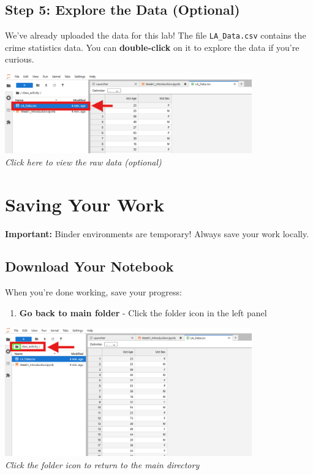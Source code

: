 \documentclass[11pt,a4paper]{article}
\begin{document}
\subsection{Step 5: Explore the Data (Optional)}

We've already uploaded the data for this lab! The file \texttt{LA\_Data.csv} contains the crime statistics data. You can \textbf{double-click} on it to explore the data if you're curious.

\begin{center}
\includegraphics[width=0.8\textwidth]{../Image_5.png}\\
\textit{Click here to view the raw data (optional)}
\end{center}

\section{Saving Your Work}

\begin{warningbox}
\textbf{Important:} Binder environments are temporary! Always save your work locally.
\end{warningbox}

\subsection{Download Your Notebook}

When you're done working, save your progress:

\begin{enumerate}
    \item \textbf{Go back to main folder} - Click the folder icon in the left panel
\end{enumerate}

\begin{center}
\includegraphics[width=0.8\textwidth]{../Image_6.png}\\
\textit{Click the folder icon to return to the main directory}
\end{center}
\end{document}
